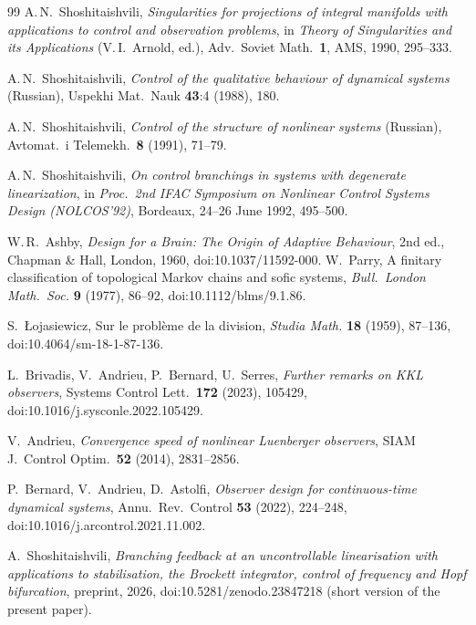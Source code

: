 \documentclass[11pt,reqno]{amsart}
\theoremstyle{plain}
\theoremstyle{definition}
\theoremstyle{remark}
\begin{document}
\begin{thebibliography}{99}\label{pg:refs}
 A.\,N.~Shoshitaishvili,
  \emph{Singularities for projections of integral manifolds with applications to
  control and observation problems}, in \emph{Theory of Singularities and its
  Applications} (V.\,I.~Arnold, ed.), Adv.\ Soviet Math.\ \textbf{1}, AMS, 1990,
  295--333.

 A.\,N.~Shoshitaishvili,
  \emph{Control of the qualitative behaviour of dynamical systems}
  \textup{(Russian)}, Uspekhi Mat.\ Nauk \textbf{43}:4 (1988), 180.

 A.\,N.~Shoshitaishvili,
  \emph{Control of the structure of nonlinear systems} \textup{(Russian)},
  Avtomat.\ i Telemekh.\ \textbf{8} (1991), 71--79.

 A.\,N.~Shoshitaishvili,
  \emph{On control branchings in systems with degenerate linearization},
  in \emph{Proc.\ 2nd IFAC Symposium on Nonlinear Control Systems Design (NOLCOS'92)}, Bordeaux,
  24--26 June 1992, 495--500.

 W.\,R.~Ashby,
  \emph{Design for a Brain: The Origin of Adaptive Behaviour}, 2nd ed., Chapman \& Hall, London, 1960,
  doi:10.1037/11592-000.
 W.~Parry, A finitary classification of topological Markov chains and sofic systems,
  \emph{Bull.\ London Math.\ Soc.} \textbf{9} (1977), 86--92, doi:10.1112/blms/9.1.86.

 S.~\L{}ojasiewicz, Sur le probl\`eme de la division, \emph{Studia Math.} \textbf{18} (1959), 87--136, doi:10.4064/sm-18-1-87-136.

 L.~Brivadis, V.~Andrieu, P.~Bernard, U.~Serres,
  \emph{Further remarks on KKL observers}, Systems Control Lett.\ \textbf{172} (2023), 105429,
  doi:10.1016/j.sysconle.2022.105429.

 V.~Andrieu,
  \emph{Convergence speed of nonlinear Luenberger observers},
  SIAM J.\ Control Optim.\ \textbf{52} (2014), 2831--2856.

 P.~Bernard, V.~Andrieu, D.~Astolfi,
  \emph{Observer design for continuous-time dynamical systems}, Annu.\ Rev.\ Control \textbf{53} (2022),
  224--248, doi:10.1016/j.arcontrol.2021.11.002.

 A.~Shoshitaishvili,
  \emph{Branching feedback at an uncontrollable linearisation with applications to stabilisation, the Brockett integrator,
  control of frequency and Hopf bifurcation}, preprint, 2026, doi:10.5281/zenodo.23847218 (short version of the present paper).


\end{thebibliography}
\end{document}
